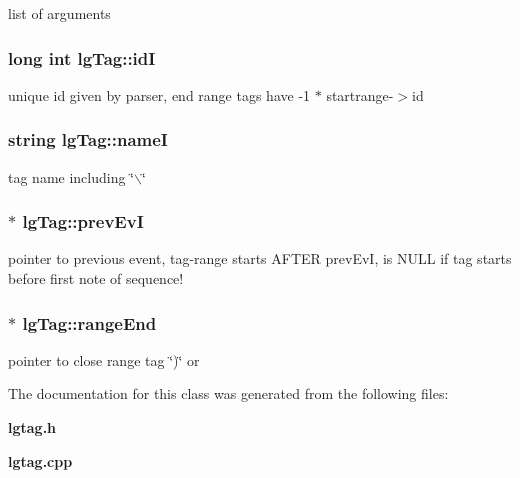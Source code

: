 list of arguments 

\subsubsection{\setlength{\rightskip}{0pt plus 5cm}long int {\bf lg\-Tag::id\-I}\hspace{0.3cm}{\tt  [private]}}\label{classlgTag_r1}


unique id given by parser, end range tags have -1 $\ast$ startrange-$>$id 

\subsubsection{\setlength{\rightskip}{0pt plus 5cm}string {\bf lg\-Tag::name\-I}\hspace{0.3cm}{\tt  [private]}}\label{classlgTag_r0}


tag name including \char`\"{}$\backslash$\char`\"{} 

\subsubsection{$\ast$ {\bf lg\-Tag::prev\-Ev\-I}\hspace{0.3cm}{\tt  [private]}}\label{classlgTag_r3}


pointer to previous event, tag-range starts AFTER prev\-Ev\-I, is NULL if tag starts before first note of sequence! 

\subsubsection{$\ast$ {\bf lg\-Tag::range\-End}\hspace{0.3cm}{\tt  [private]}}\label{classlgTag_r4}


pointer to close range tag \char`\"{})\char`\"{} or  



The documentation for this class was generated from the following files:\begin{CompactItemize}
\item 
{\bf lgtag.h}\item 
{\bf lgtag.cpp}\end{CompactItemize}
